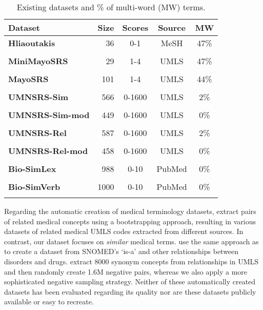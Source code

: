 \documentclass[letterpaper]{article} %
\begin{document}
\begin{table}[ht]
    \centering
    \small
    \begin{tabular}{l r c c c}
    \toprule
         \textbf{Dataset} & \textbf{Size} & \textbf{Scores} & \textbf{Source} & \textbf{MW}\\ \midrule
         \textbf{Hliaoutakis} & 36 & 0-1 & MeSH & 47\%\\
          \cite{Hliaoutakis2005} \\
         \textbf{MiniMayoSRS} & 29 & 1-4 & UMLS & 47\%\\
         \cite{PedersenPPC2007} \\
         \textbf{MayoSRS} & 101 & 1-4 & UMLS & 44\%\\
          \cite{PakhomovEtAl2011}\\
         \textbf{UMNSRS-Sim} & 566 & 0-1600 & UMLS & 2\%\\
          \cite{PakhomovEtAl2010}\\
         \textbf{UMNSRS-Sim-mod} & 449 & 0-1600 & UMLS & 0\%\\
          \cite{PakhomovEtAl2016}\\
         \textbf{UMNSRS-Rel} & 587 & 0-1600 & UMLS & 2\% \\
          \cite{PakhomovEtAl2010}\\
         \textbf{UMNSRS-Rel-mod} & 458 & 0-1600 & UMLS & 0\%\\
          \cite{PakhomovEtAl2016}\\
         \textbf{Bio-SimLex} & 988 & 0-10 & PubMed & 0\%\\
          \cite{ChiuPVK2018}\\
         \textbf{Bio-SimVerb} & 1000 & 0-10 & PubMed & 0\%\\
          \cite{ChiuPVK2018}\\
         \bottomrule
    \end{tabular}
    \caption{Existing datasets and \% of multi-word (MW) terms.}
    \label{tab:existing_data}
\end{table}

Regarding the automatic creation of medical terminology datasets, \citeauthor{BeamEtAl2018}  extract pairs of related medical concepts using a bootstrapping approach, resulting in various datasets of related medical UMLS codes extracted from different sources.
In contrast, our dataset focuses on \emph{similar} medical terms.
\citeauthor{AgarwalEtAl2019}  use the same approach as \citeauthor{BeamEtAl2018} to create a dataset from SNOMED's `is-a' and other relationships between disorders and drugs.
\citeauthor{WangCZ2015}  extract 8000 synonym concepts from relationships in UMLS and then randomly create 1.6M negative pairs, whereas 
we also apply a more sophisticated negative sampling strategy.
Neither of these automatically created datasets has been evaluated regarding its quality nor are these datasets publicly available or easy to recreate.
\end{document}
